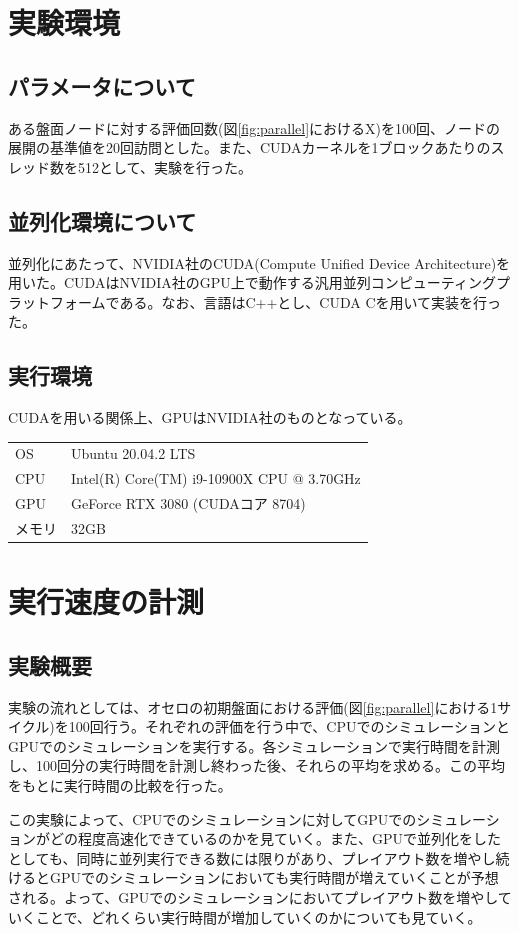 \documentclass[10pt, a4paper]{jsarticle}
\begin{document}
\section{実験環境}
\subsection{パラメータについて}
ある盤面ノードに対する評価回数(図\ref{fig:parallel}におけるX)を100回、ノードの展開の基準値を20回訪問とした。また、CUDAカーネルを1ブロックあたりのスレッド数を512として、実験を行った。
\subsection{並列化環境について}
並列化にあたって、NVIDIA社のCUDA(Compute Unified Device Architecture)を用いた。CUDAはNVIDIA社のGPU上で動作する汎用並列コンピューティングプラットフォームである。なお、言語はC++とし、CUDA Cを用いて実装を行った。
\subsection{実行環境}
CUDAを用いる関係上、GPUはNVIDIA社のものとなっている。
\begin{table}[ht]
    \begin{center}
        \begin{tabular}{ll}
            OS & Ubuntu 20.04.2 LTS \\
            CPU & Intel(R) Core(TM) i9-10900X CPU @ 3.70GHz \\
            GPU & GeForce RTX 3080 (CUDAコア 8704)\\
            メモリ & 32GB \\
        \end{tabular}
    \end{center}
\end{table}
\section{実行速度の計測}
\subsection{実験概要}
実験の流れとしては、オセロの初期盤面における評価(図\ref{fig:parallel}における1サイクル)を100回行う。それぞれの評価を行う中で、CPUでのシミュレーションとGPUでのシミュレーションを実行する。各シミュレーションで実行時間を計測し、100回分の実行時間を計測し終わった後、それらの平均を求める。この平均をもとに実行時間の比較を行った。
\par この実験によって、CPUでのシミュレーションに対してGPUでのシミュレーションがどの程度高速化できているのかを見ていく。また、GPUで並列化をしたとしても、同時に並列実行できる数には限りがあり、プレイアウト数を増やし続けるとGPUでのシミュレーションにおいても実行時間が増えていくことが予想される。よって、GPUでのシミュレーションにおいてプレイアウト数を増やしていくことで、どれくらい実行時間が増加していくのかについても見ていく。
\end{document}

